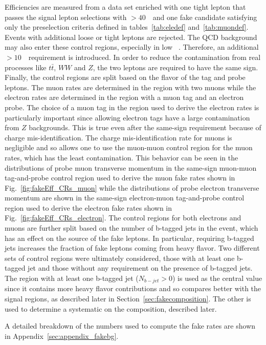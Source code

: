 Efficiencies are measured from a data set enriched with one tight lepton that passes the signal lepton selections with \pt$>40$~\GeV\ and 
one fake candidate satisfying only the preselection criteria defined in tables~\ref{tab:eledef} and~\ref{tab:muondef}. Events with additional loose or tight leptons are rejected. 
The QCD background may also enter these control regions, especially in low \met\ . Therefore, an additional \met$>10$~\GeV\ requirement is introduced. 
In order to reduce the contamination from real processes like $t\bar{t}$, $WW$ and $Z$, the two leptons are required to have the same sign.
Finally, the control regions are split based on the flavor of the tag and probe leptons.  The muon rates are determined in the region
with two muons while the electron rates are determined in the region with a muon tag and an electron probe.  The choice of a muon tag 
in the region used to derive the electron rates is particularly important since allowing electron tags have a large contamination from $Z$ backgrounds.
This is true even after the same-sign requirement because of charge mis-identification.  
The charge mis-identification rate for muons is negligible
and so allows one to use the muon-muon control region for the muon rates, which has the least contamination.
This behavior can be seen in the distributions of probe muon transverse momentum in the same-sign muon-muon tag-and-probe control region used to derive
the muon fake rates shown in Fig.~\ref{fig:fakeEff_CRs_muon} while
the distributions of probe electron transverse momentum are shown in the same-sign electron-muon tag-and-probe control region used to derive
the electron fake rates shown in Fig.~\ref{fig:fakeEff_CRs_electron}.
The control regions for both electrons and muons are further split based on the number of b-tagged jets in the event, 
which has an effect on the source of the fake leptons.  In particular, requiring b-tagged jets increases the fraction
of fake leptons coming from heavy flavor. Two different sets of control regions were ultimately considered, those
with at least one b-tagged jet and those without any requirement on the presence of b-tagged jets.  The region
with at least one b-tagged jet ($N_{b-jet} > 0$) is used as the central value since it contains more heavy flavor contributions
and so compares better with the signal regions, as described later in Section~\ref{sec:fakecomposition}.  The other is used 
to determine a systematic on the composition, described later.  


A detailed breakdown of the numbers used to compute the fake rates are shown in Appendix~\ref{sec:appendix_fakebg}.

